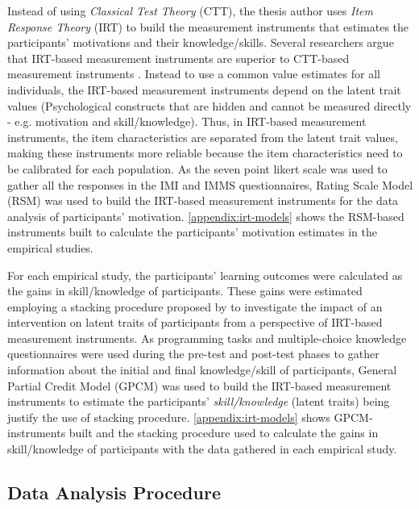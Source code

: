 Instead of using \emph{Classical Test Theory} (CTT), the thesis author uses \emph{Item Response Theory} (IRT) to build the measurement instruments that estimates the participants' motivations and their knowledge/skills. 
Several researchers argue that IRT-based measurement instruments are superior to CTT-based measurement instruments \cite{PetrilloCanoMcLeodCoon2015,AbedalazizLeng2013}.
Instead to use a common value estimates for all individuals, the IRT-based measurement instruments depend on the latent trait values (Psychological constructs that are hidden and cannot be measured directly - e.g. motivation and skill/knowledge).
Thus, in IRT-based measurement instruments, the item characteristics are separated from the latent trait values, making these instruments more reliable because the item characteristics need to be calibrated for each population.
As the seven point likert scale was used to gather all the responses in the IMI and IMMS questionnaires, Rating Scale Model (RSM) was used to build the IRT-based measurement instruments for the data analysis of participants' motivation.
\autoref{appendix:irt-models} shows the RSM-based instruments built to calculate the participants' motivation estimates in the empirical studies.

For each empirical study, the participants' learning outcomes were calculated as the gains in skill/knowledge of participants.
These gains were estimated employing a stacking procedure proposed by  to investigate the impact of an intervention on latent traits of participants from a perspective of IRT-based measurement instruments.
As programming tasks and multiple-choice knowledge questionnaires were used during the pre-test and post-test phases to gather information about the initial and final knowledge/skill of participants, General Partial Credit Model (GPCM) was used to build the IRT-based measurement instruments to estimate the participants' \emph{skill/knowledge} (latent traits) being justify the use of stacking procedure.
\autoref{appendix:irt-models} shows GPCM-instruments built and the stacking procedure used to calculate the gains in skill/knowledge of participants with the data gathered in each empirical study.

\subsection{Data Analysis Procedure}
\label{sec:evaluation-analysis-procedure}

